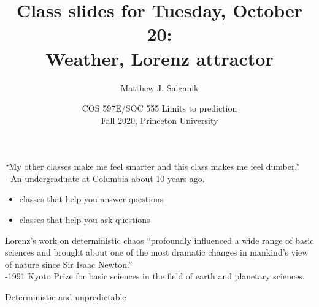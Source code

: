 \documentclass[aspectratio=169]{beamer}
\title[]{Class slides for Tuesday, October 20:\\Weather, Lorenz attractor}
\author[]{Matthew J. Salganik}
\institute[]{}
\date[]{COS 597E/SOC 555 Limits to prediction\\Fall 2020, Princeton University}
\begin{document}
\frame{\titlepage}
\begin{frame}

``My other classes make me feel smarter and this class makes me feel dumber.''\\
- An undergraduate at Columbia about 10 years ago.

\pause
\vfill
\begin{itemize}
\item classes that help you answer questions
\item classes that help you ask questions
\end{itemize}

\end{frame}
\begin{frame}

Lorenz's work on deterministic chaos ``profoundly influenced a wide range of basic sciences and brought about one of the most dramatic changes in mankind's view of nature since Sir Isaac Newton.''\\
 
-1991 Kyoto Prize for basic sciences in the field of earth and planetary sciences.

\end{frame}
\begin{frame}

\Large{
Deterministic and unpredictable 
}

\end{frame}
\end{document}
